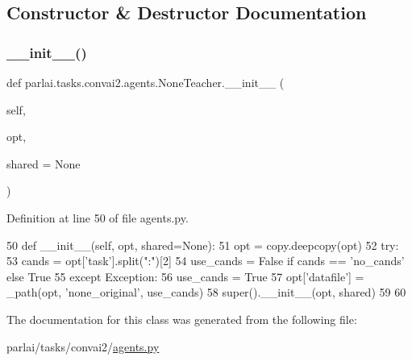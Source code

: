\subsection{Constructor \& Destructor Documentation}
\mbox{\label{classparlai_1_1tasks_1_1convai2_1_1agents_1_1NoneTeacher_ab4fbfba45b52e37ca3293273880b56e6}} 
\subsubsection{\texorpdfstring{\+\_\+\+\_\+init\+\_\+\+\_\+()}{\_\_init\_\_()}}
{\footnotesize\ttfamily def parlai.\+tasks.\+convai2.\+agents.\+None\+Teacher.\+\_\+\+\_\+init\+\_\+\+\_\+ (\begin{DoxyParamCaption}\item[{}]{self,  }\item[{}]{opt,  }\item[{}]{shared = {\ttfamily None} }\end{DoxyParamCaption})}



Definition at line 50 of file agents.\+py.


\begin{DoxyCode}
50     \textcolor{keyword}{def }\_\_init\_\_(self, opt, shared=None):
51         opt = copy.deepcopy(opt)
52         \textcolor{keywordflow}{try}:
53             cands = opt[\textcolor{stringliteral}{'task'}].split(\textcolor{stringliteral}{":"})[2]
54             use\_cands = \textcolor{keyword}{False} \textcolor{keywordflow}{if} cands == \textcolor{stringliteral}{'no\_cands'} \textcolor{keywordflow}{else} \textcolor{keyword}{True}
55         \textcolor{keywordflow}{except} Exception:
56             use\_cands = \textcolor{keyword}{True}
57         opt[\textcolor{stringliteral}{'datafile'}] = \_path(opt, \textcolor{stringliteral}{'none\_original'}, use\_cands)
58         super().\_\_init\_\_(opt, shared)
59 
60 
\end{DoxyCode}


The documentation for this class was generated from the following file\+:\begin{DoxyCompactItemize}
\item 
parlai/tasks/convai2/\hyperlink{parlai_2tasks_2convai2_2agents_8py}{agents.\+py}\end{DoxyCompactItemize}

